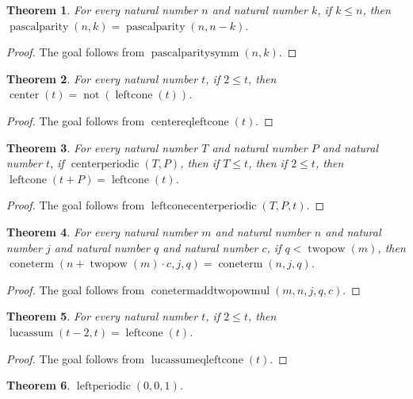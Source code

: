 \documentclass[11pt]{article}
\newtheorem{theorem}{Theorem}[section]
\theoremstyle{definition}
\begin{document}
\begin{theorem}
\label{ll:observations:pascal-parity-symm}
For every natural number \(n\) and natural number \(k\), if \(k \le n\), then \(\operatorname{pascalparity}(n, k) = \operatorname{pascalparity}(n, n - k)\).
\end{theorem}
\begin{proof}
The goal follows from \(\operatorname{pascalparitysymm}(n, k)\).
\end{proof}
\begin{theorem}
\label{ll:observations:center-eq-left-cone}
For every natural number \(t\), if \(2 \le t\), then \(\operatorname{center}(t) = \operatorname{not}(\operatorname{leftcone}(t))\).
\end{theorem}
\begin{proof}
The goal follows from \(\operatorname{centereqleftcone}(t)\).
\end{proof}
\begin{theorem}
\label{ll:observations:left-cone-center-periodic}
For every natural number \(T\) and natural number \(P\) and natural number \(t\), if \(\operatorname{centerperiodic}(T, P)\), then if \(T \le t\), then if \(2 \le t\), then \(\operatorname{leftcone}(t + P) = \operatorname{leftcone}(t)\).
\end{theorem}
\begin{proof}
The goal follows from \(\operatorname{leftconecenterperiodic}(T, P, t)\).
\end{proof}
\begin{theorem}
\label{ll:observations:cone-term-add-twopow-mul}
For every natural number \(m\) and natural number \(n\) and natural number \(j\) and natural number \(q\) and natural number \(c\), if \(q < \operatorname{twopow}(m)\), then \(\operatorname{coneterm}(n + \operatorname{twopow}(m) \cdot c, j, q) = \operatorname{coneterm}(n, j, q)\).
\end{theorem}
\begin{proof}
The goal follows from \(\operatorname{conetermaddtwopowmul}(m, n, j, q, c)\).
\end{proof}
\begin{theorem}
\label{ll:observations:lucas-sum-eq-left-cone}
For every natural number \(t\), if \(2 \le t\), then \(\operatorname{lucassum}(t - 2, t) = \operatorname{leftcone}(t)\).
\end{theorem}
\begin{proof}
The goal follows from \(\operatorname{lucassumeqleftcone}(t)\).
\end{proof}
\begin{theorem}
\label{ll:observations:left-periodic-zero}
\(\operatorname{leftperiodic}(0, 0, 1)\).
\end{theorem}
\end{document}

